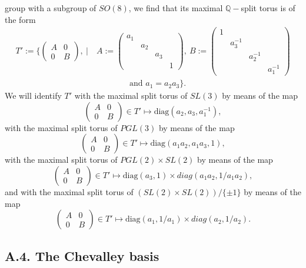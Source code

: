 \documentclass[12pt,letterpaper]{amsart}
\newcommand{\qqq}{\mathbb{Q}}
\begin{document}
group with a subgroup of $SO(8)$, we find that its maximal
$\qqq-$split torus is of the form
\[
\begin{split}
T':= \Big\{\begin{pmatrix} A&0\\0&B \end{pmatrix},\ |\
&A:={\left(\begin{smallmatrix} a_1&&&\\
&a_2&&\\
&&a_3&\\
&&&1 \end{smallmatrix}\right)},\
B:= {\left(\begin{smallmatrix} 1&&&\\
&a_3^{-1}&&\\
&&a_2^{-1}&\\
&&&a_1^{-1} \end{smallmatrix}\right)}\\
&\quad\quad\quad\quad\text{and } a_1 = a_2a_3\Big\}.
\end{split}\tag{A.12}
\]
We will identify $T'$ with the maximal split torus of
$SL(3)$ by means of the map
\[
\begin{pmatrix} A&0\\0&B \end{pmatrix} \in T' \longmapsto
\text{diag}(a_2,a_3,a_1^{-1}),
\]
with the maximal split torus of
$PGL(3)$ by means of the map
\[
\begin{pmatrix} A&0\\0&B \end{pmatrix} \in T' \longmapsto
\text{diag}(a_1a_2,a_1a_3,1),\tag{A.13}
\]
with the maximal split torus of
$PGL(2)\times SL(2)$ by means of the map
\[
\begin{pmatrix} A&0\\0&B \end{pmatrix} \in T' \longmapsto
\text{diag}(a_3,1)\times diag(a_1a_2,1/a_1a_2),
\tag{A.13$'$}
\]
and with the maximal split torus of
$(SL(2)\times SL(2))/\{\pm 1\}$ by means of the map
\[
\begin{pmatrix} A&0\\0&B \end{pmatrix} \in T' \longmapsto
\text{diag}(a_1,1/a_1)\times diag(a_2,1/a_2).
\tag{A.13$''$}
\]

\subsection*{A.4. The Chevalley basis}
\end{document}
